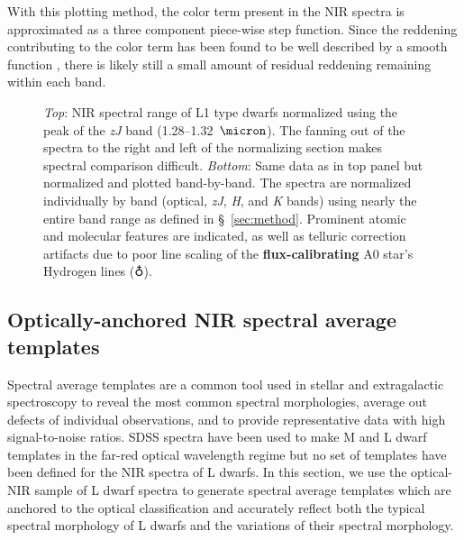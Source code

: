 \documentclass[modern,trackchanges]{aastex61}
\begin{document}
With this plotting method, the color term present in the NIR spectra is approximated as a three component piece-wise step function.
Since the reddening contributing to the color term has been found to be well described by a smooth function \citep{Marocco:2014kr,Hiranaka:2016jm}, there is likely still a small amount of residual reddening remaining within each band.

\begin{figure}
  \caption{\emph{Top}: NIR spectral range of L1 type dwarfs normalized using the peak of the \emph{zJ} band (1.28--1.32~$\micron$). The fanning out of the spectra to the right and left of the normalizing section makes spectral comparison difficult.
    \emph{Bottom}: Same data as in top panel but normalized and plotted band-by-band. The spectra are normalized individually by band (optical, \emph{zJ}, \emph{H}, and \emph{K} bands) using nearly the entire band range as defined in \S~\ref{sec:method}. Prominent atomic and molecular features are indicated, as well as telluric correction artifacts due to poor line scaling of the \textbf{ flux-calibrating} A0 star's Hydrogen lines ($\earth$).}
  \label{fig:L1fan}
\end{figure}

\subsection{Optically-anchored NIR spectral average templates}
\label{sec:templates}

Spectral average templates are a common tool used in stellar and extragalactic spectroscopy to reveal the most common spectral morphologies, average out defects of individual observations, and to provide representative data with high signal-to-noise ratios.
SDSS spectra have been used to make M and L dwarf templates in the far-red optical wavelength regime \citep{Bochanski07_templates, Schmidt:2014jc} but no set of templates have been defined for the NIR spectra of L dwarfs.
In this section, we use the optical-NIR sample of L dwarf spectra to generate spectral average templates which are anchored to the optical classification and accurately reflect both the typical spectral morphology of L dwarfs and the variations of their spectral morphology.
\end{document}
